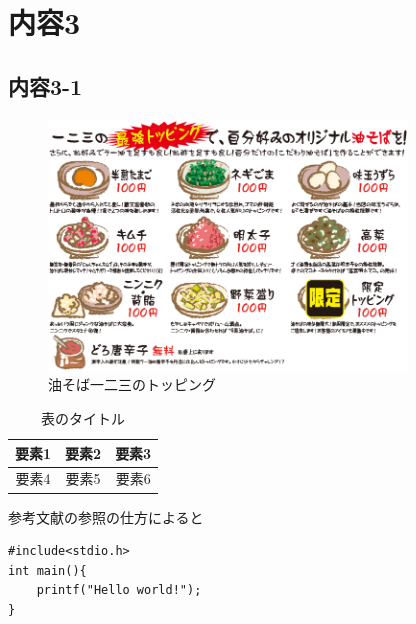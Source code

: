 \section{内容3}
\subsection{内容3-1}

\begin{figure}[b]
    \centering
    \includegraphics[width=0.85\textwidth]{./fig/hifumi_topping.png}
    \caption{油そば一二三のトッピング}
    \label{LABEL_FIGURE}
\end{figure}

\begin{table}[b]
    \centering
    \caption{表のタイトル}
    \begin{tabular}{|c|c|c|} \hline
        要素1 & 要素2 & 要素3 \\ \hline
        要素4 & 要素5 & 要素6 \\ \hline
    \end{tabular}
    \label{LABEL_TABLE}
\end{table}

参考文献の参照の仕方\cite{meinronbun}によると

\begin{lstlisting}[caption=Hello World,label=dockerfile]
#include<stdio.h>
int main(){
    printf("Hello world!");
}
\end{lstlisting}
